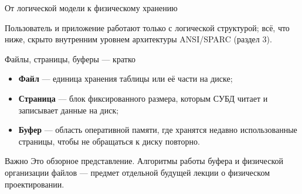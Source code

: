 \documentclass[aspectratio=169]{beamer}
\begin{document}
\begin{frame}{От логической модели к физическому хранению}

\begin{center}
\end{center}

\footnotesize
Пользователь и приложение работают только с логической
структурой; всё, что ниже, скрыто внутренним уровнем
архитектуры ANSI/SPARC (раздел 3).

\end{frame}


\begin{frame}{Файлы, страницы, буферы — кратко}

\begin{itemize}
  \item \textbf{Файл} — единица хранения таблицы или её части
        на диске;
  \item \textbf{Страница} — блок фиксированного размера,
        которым СУБД читает и записывает данные на диск;
  \item \textbf{Буфер} — область оперативной памяти,
        где хранятся недавно использованные страницы,
        чтобы не обращаться к диску повторно.
\end{itemize}

\vspace{0.3cm}

\begin{alertblock}{Важно}
Это обзорное представление. Алгоритмы работы буфера
и физической организации файлов — предмет отдельной
будущей лекции о физическом проектировании.
\end{alertblock}

\end{frame}
\end{document}
